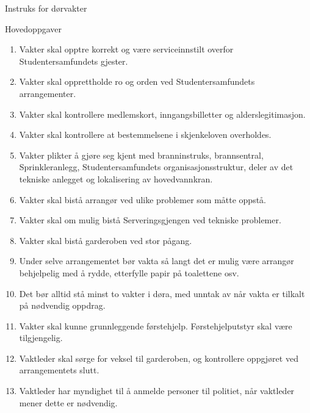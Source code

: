 \documentclass[fsbok.tex]{subfiles}
\begin{document}
\begin{instruks*}{Instruks for dørvakter}
    \begin{instruksledd}{Hovedoppgaver}
        \begin{enumerate}
            \item Vakter skal opptre korrekt og være serviceinnstilt overfor Studentersamfundets gjester.
            \item Vakter skal opprettholde ro og orden ved Studentersamfundets arrangementer.
            \item Vakter skal kontrollere medlemskort, inngangsbilletter og alderslegitimasjon.
            \item Vakter skal kontrollere at bestemmelsene i skjenkeloven overholdes.
            \item Vakter plikter å gjøre seg kjent med branninstruks, brannsentral, Sprinkleranlegg, Studentersamfundets
                organisasjonsstruktur, deler av det tekniske anlegget og lokalisering av hovedvannkran.
            \item Vakter skal bistå arrangør ved ulike problemer som måtte oppstå.
            \item Vakter skal om mulig bistå Serveringsgjengen ved tekniske problemer.
            \item Vakter skal bistå garderoben ved stor pågang.
            \item Under selve arrangementet bør vakta så langt det er mulig være arrangør behjelpelig med å rydde, etterfylle
                papir på toalettene osv.
            \item Det bør alltid stå minst to vakter i døra, med unntak av når vakta er tilkalt på nødvendig oppdrag.
            \item Vakter skal kunne grunnleggende førstehjelp. Førstehjelputstyr skal være tilgjengelig.
            \item Vaktleder skal sørge for veksel til garderoben, og kontrollere oppgjøret ved arrangementets slutt. 
            \item Vaktleder har myndighet til å anmelde personer til politiet, når vaktleder mener dette er nødvendig.
        \end{enumerate}
    \end{instruksledd}


\end{instruks*}
\end{document}
